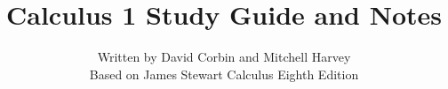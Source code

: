 \documentclass{article}
\begin{document}
\title{Calculus 1 Study Guide and Notes}
\date{}
\author{Written by David Corbin and Mitchell Harvey\\ \small{Based on James Stewart Calculus Eighth Edition}}
\maketitle
\end{document}
